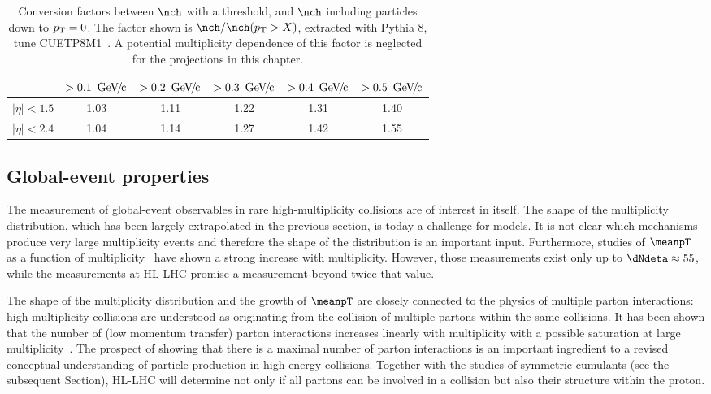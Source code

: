 \documentclass[../report.tex]{subfiles}
\begin{document}
\begin{table}
\centering
\begin{tabular}{c|c|c|c|c|c}
\backslashbox{$|\eta|$}{$\pT$} & $> \unit[0.1]{\UGeVc}$ & $> \unit[0.2]{\UGeVc}$ & $> \unit[0.3]{\UGeVc}$ & $> \unit[0.4]{\UGeVc}$ & $> \unit[0.5]{\UGeVc}$ \\
\hline
$|\eta| < 1.5$ & 1.03 & 1.11 & 1.22 & 1.31 & 1.40 \\
\hline
$|\eta| < 2.4$ & 1.04 & 1.14 & 1.27 & 1.42 & 1.55 \\
\hline
\end{tabular}
\caption{Conversion factors between $\nch$ with a \pT threshold, and $\nch$ including particles down to $p\sb{\scriptstyle\mathrm{T}} = 0$. The factor shown is $\nch / \nch(\pT > X)$, extracted with Pythia 8, tune CUETP8M1~\cite{Khachatryan:2015pea}. A potential multiplicity dependence of this factor is neglected for the projections in this chapter.}
\label{tab:smallsystems_conversion}
\end{table}

\subsection{Global-event properties}
\label{sect:smallsystems_global}
  
The measurement of global-event observables in rare high-multiplicity \pp collisions are of interest in itself. The shape of the multiplicity distribution, which has been largely extrapolated in the previous section, is today a challenge for models. 
It is not clear which mechanisms produce very large multiplicity events and therefore the shape of the distribution is an important input. 
Furthermore, studies of $\meanpT$ as a function of multiplicity~\cite{Abelev:2013bla} have shown a strong increase with multiplicity. However, those measurements exist only up to $\dNdeta \approx 55$, while the measurements at HL-LHC promise a measurement beyond twice that value. 

The shape of the multiplicity distribution and the growth of $\meanpT$ are closely connected to the physics of multiple parton interactions: high-multiplicity collisions are understood as originating from the collision of multiple partons within the same \pp collisions. It has been shown that the number of (low momentum transfer) parton interactions increases linearly with multiplicity with a possible saturation at large multiplicity~\cite{Abelev:2013sqa}. The prospect of showing that there is a maximal number of parton interactions is an important ingredient to a revised conceptual understanding of particle production in high-energy \pp collisions. Together with the studies of symmetric cumulants (see the subsequent Section), HL-LHC will determine not only if all partons can be involved in a collision but also their structure within the proton.
\end{document}
